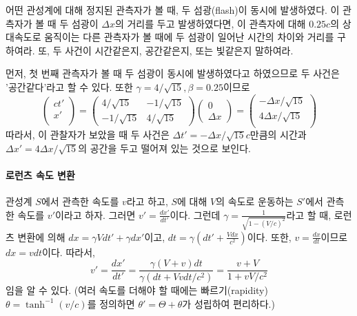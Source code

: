 \begin{example}
어떤 관성계에 대해 정지된 관측자가 볼 때, 두 섬광(flash)이 동시에 발생하였다. 이 관측자가 볼 때 두 섬광이 $\Delta x$의 거리를 두고 발생하였다면, 이 관측자에 대해 $0.25c$의 상대속도로 움직이는 다른 관측자가 볼 때에 두 섬광이 일어난 시간의 차이와 거리를 구하여라. 또,  두 사건이 시간같은지, 공간같은지, 또는 빛같은지 말하여라.
\end{example}
먼저, 첫 번째 관측자가 볼 때 두 섬광이 동시에 발생하였다고 하였으므로 두 사건은 '공간같다'라고 할 수 있다. 또한 $\gamma = 4/\sqrt{15}, \beta = 0.25$이므로 
\begin{equation}
\begin{pmatrix}
ct'\\
x'\\
\end{pmatrix}
= \begin{pmatrix}
4/\sqrt{15}& -1/\sqrt{15}\\
-1/\sqrt{15}&4/\sqrt{15}
\end{pmatrix}
\begin{pmatrix}
0\\ 
\Delta x
\end{pmatrix}
= \begin{pmatrix}
-\Delta x/\sqrt{15}\\
4\Delta x/\sqrt{15}\\
\end{pmatrix}
\end{equation}
따라서, 이 관찰자가 보았을 때 두 사건은 $\Delta t'=-\Delta x/\sqrt{15}c$만큼의 시간과 $\Delta x' = 4\Delta x/\sqrt{15}$의 공간을 두고 떨어져 있는 것으로 보인다.

\paragraph{로런츠 속도 변환}
관성계 $S$에서 관측한 속도를 $v$라고 하고, $S$에 대해 $V$의 속도로 운동하는 $S'$에서 관측한 속도를 $v'$이라고 하자. 그러면 $v'=\frac{dx'}{dt'}$이다. 그런데 $\gamma = \frac{1}{\sqrt{1-(V/c)^2}}$라고 할 때, 로런츠 변환에 의해 $dx=\gamma V dt' + \gamma dx'$이고, $dt=\gamma( dt' +\frac{Vdx}{c^2})$이다. 또한, $v=\frac{dx}{dt}$이므로 $dx=vdt$이다. 따라서, 
\begin{equation}
v'=\frac{dx'}{dt'}=\frac{\gamma(V+v)dt}{\gamma(dt+Vvdt/c^2)}=\frac{v+V}{1+vV/c^2}
\end{equation}
임을 알 수 있다. (여러 속도를 더해야 할 때에는 빠르기(rapidity) $\theta = \tanh^{-1}(v/c)$를 정의하면 $\theta'=\Theta +\theta$가 성립하여 편리하다.)

